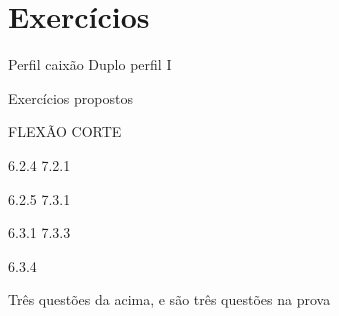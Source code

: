 \cabecalho

\section*{Exercícios}

    Perfil caixão
    Duplo perfil I

    Exercícios propostos

    FLEXÃO      CORTE

    6.2.4       7.2.1

    6.2.5       7.3.1

    6.3.1       7.3.3

    6.3.4       


    Três questões da acima, e são três questões na prova
